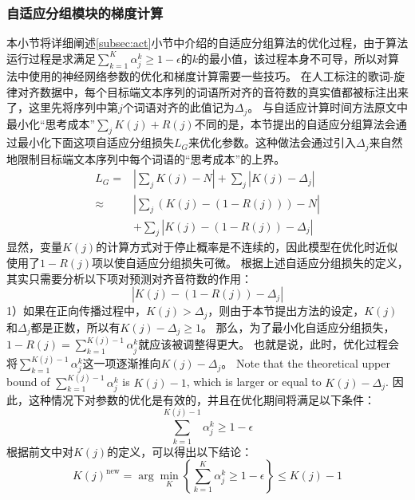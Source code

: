 \subsubsection{自适应分组模块的梯度计算}
本小节将详细阐述\ref{subsec:act}小节中介绍的自适应分组算法的优化过程，由于算法运行过程是求满足$\sum_{k=1}^K \alpha_j^k \geq 1-\epsilon$的$k$的最小值，该过程本身不可导，所以对算法中使用的神经网络参数的优化和梯度计算需要一些技巧。
在人工标注的歌词-旋律对齐数据中，每个目标端文本序列的词语所对齐的音符数的真实值都被标注出来了，这里先将序列中第$j$个词语对齐的此值记为$\Delta_j$。
与自适应计算时间方法\citep{act}原文中最小化``思考成本''$\sum_j K(j) + R(j)$不同的是，本节提出的自适应分组算法会通过最小化下面这项自适应分组损失$L_G$来优化参数。这种做法会通过引入$\Delta_j$来自然地限制目标端文本序列中每个词语的``思考成本''的上界。
\begin{equation}
\begin{array}{rl}
    L_G = & \left| \sum_j K(j) - N \right| + \sum_j \left|K(j) - \Delta_j\right| \\
    \approx &\left|\sum_j \left(K(j) - (1 - R(j))\right) - N \right| \\
    & + \sum_j \left|K(j) - (1 - R(j)) - \Delta_j\right|
\end{array}
\end{equation}
显然，变量$K(j)$的计算方式对于停止概率是不连续的，因此模型在优化时近似使用了$1-R(j)$项以使自适应分组损失可微。
根据上述自适应分组损失的定义，其实只需要分析以下项对预测对齐音符数的作用：
\begin{equation}
    \left| K(j) - (1 - R(j)) - \Delta_j \right|
\end{equation}
1）如果在正向传播过程中，$K(j) > \Delta_j$，则由于本节提出方法的设定，$K(j)$和$\Delta_j$都是正数，所以有$K(j) - \Delta_j \geq 1$。
那么，为了最小化自适应分组损失，$1 - R(j)=\sum_{k=1}^{K(j)-1}\alpha_j^k$就应该被调整得更大。
也就是说，此时，优化过程会将$\sum_{k=1}^{K(j)-1}\alpha_j^k$这一项逐渐推向$K(j) - \Delta_j$。
Note that the theoretical upper bound of $\sum_{k=1}^{K(j)-1}\alpha_j^k$ is $K(j)- 1$, which is larger or equal to $K(j)- \Delta_j$.
因此，这种情况下对参数的优化是有效的，并且在优化期间将满足以下条件：
\begin{equation}
    \sum_{k=1}^{K(j)-1}\alpha_j^k \geq 1 - \epsilon
\end{equation}
根据前文中对$K(j)$的定义，可以得出以下结论：
\begin{equation}
    K(j)^{\text{new}} = \arg\min_{K}\left\{\sum_{k=1}^K \alpha_j^k \geq 1 - \epsilon\right\} \leq K(j) - 1
\end{equation}
